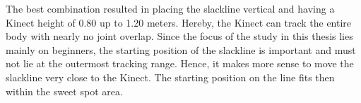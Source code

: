 The best combination resulted in placing the slackline vertical and having a Kinect height of 0.80 up to 1.20 meters. Hereby, the Kinect can track the entire body with nearly no joint overlap.
Since the focus of the study in this thesis lies mainly on beginners, the starting position of the slackline is important and must not lie at the outermost tracking range.
Hence, it makes more sense to move the slackline very close to the Kinect. The starting position on the line fits then within the sweet spot area.
